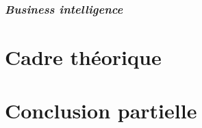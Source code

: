             \subsubsection[Business intelligence]{\textit{Business intelligence}}
    \section[Cadre théorique]{Cadre théorique}
    \section[Conclusion partielle]{Conclusion partielle}